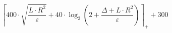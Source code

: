 \[\left\lceil 400 \cdot \sqrt{\frac{L \cdot R^{2}}{\varepsilon}} + 40 \cdot \log_{2}\left(2 + \frac{\Delta + L \cdot R^{2}}{\varepsilon}\right) \right\rceil_{+} + 300\]
